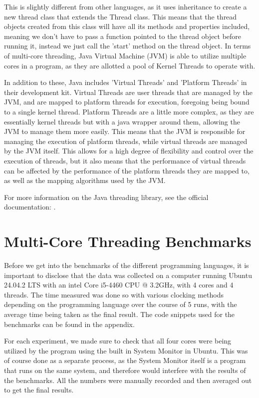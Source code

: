 \documentclass[12pt,a4paper]{article}
\begin{document}
This is slightly different from other languages, as it uses inheritance to create a new thread class that extends the Thread class. This means that the thread objects created from this class will have all its methods and properties included, meaning we don't have to pass a function pointed to the thread object before running it, instead we just call the 'start' method on the thread object. In terms of multi-core threading, Java Virtual Machine (JVM) is able to utilize multiple cores in a program, as they are allotted a pool of Kernel Threads to operate with.

In addition to these, Java includes 'Virtual Threads' and 'Platform Threads'\parencite{JavaVirtualThreads} in their development kit. Virtual Threads are user threads that are managed by the JVM, and are mapped to platform threads for execution, foregoing being bound to a single kernel thread. Platform Threads are a little more complex, as they are essentially kernel threads but with a java wrapper around them, allowing the JVM to manage them more easily. This means that the JVM is responsible for managing the execution of platform threads, while virtual threads are managed by the JVM itself. This allows for a high degree of flexibility and control over the execution of threads, but it also means that the performance of virtual threads can be affected by the performance of the platform threads they are mapped to, as well as the mapping algorithms used by the JVM.

For more information on the Java threading library, see the official documentation: .

\section{Multi-Core Threading Benchmarks}

Before we get into the benchmarks of the different programming languages, it is important to disclose that the data was collected on a computer running Ubuntu 24.04.2 LTS with an intel Core i5-4460 CPU @ 3.2GHz, with 4 cores and 4 threads. The time measured was done so with various clocking methods depending on the programming language over the course of 5 runs, with the average time being taken as the final result. The code snippets used for the benchmarks can be found in the appendix.

For each experiment, we made sure to check that all four cores were being utilized by the program using the built in System Monitor in Ubuntu. This was of course done as a separate process, as the System Monitor itself is a program that runs on the same system, and therefore would interfere with the results of the benchmarks. All the numbers were manually recorded and then averaged out to get the final results. 
\end{document}
